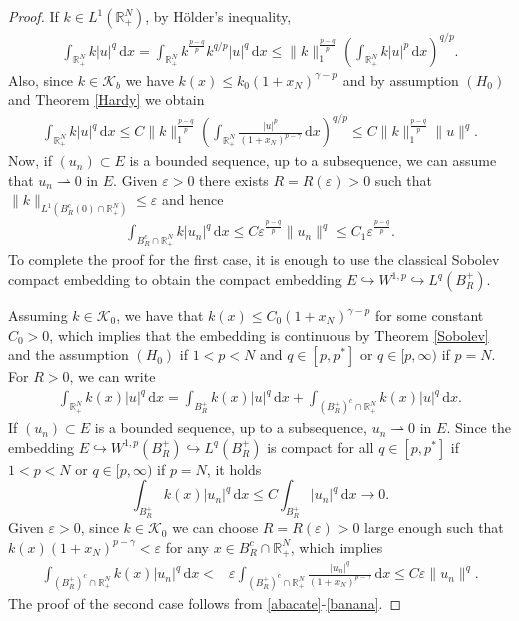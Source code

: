 \documentclass[12pt,reqno]{amsart}
\begin{document}
\begin{proof} 
If $k \in L^1(\mathds{R}^N_+)$, by H\"{o}lder's inequality,
\begin{align*}
\int_{\mathds{R}^N_+}k|u|^q\, \mathrm{d} x=\int_{\mathds{R}^N_+}k^{\frac{p-q}{p}}k^{q/p}|u|^q\, \mathrm{d} x
    \leq\|k\|_1^{\frac{p-q}{p}}\left(\int_{\mathds{R}^N_+} k|u|^p\, \mathrm{d} x\right)^{q/p}.
\end{align*}
Also, since $k\in\mathcal{K}_b$ we have $k(x)\leq k_0(1+x_N)^{\gamma-p}$ and  by assumption $(H_0)$ and  Theorem \ref{Hardy} we obtain
\begin{align*}
\int_{\mathds{R}^N_+}k|u|^q \, \mathrm{d} x\leq C\|k\|_1^{\frac{p-q}{p}}\left(\int_{\mathds{R}^N_+}\frac{|u|^p}{(1+x_N)^{p-\gamma}} \, \mathrm{d} x \right)^{q/p}
\leq C\|k\|_1^{\frac{p-q}{p}}\|u\|^q.
\end{align*}
Now, if $(u_n) \subset E$ is a bounded sequence, up to a subsequence, we can assume that $u_n \rightharpoonup 0$ in $E$. Given $\varepsilon>0$ there exists $R=R(\varepsilon)>0$ such that $\|k\|_{L^1(B^c_R(0)\cap\mathds{R}^N_+)}\leq\varepsilon$ and hence 
\begin{align*}
\int_{B_R^c\cap \mathds{R}^N_+}k|u_n|^q\, \mathrm{d} x\leq  C\varepsilon^{\frac{p-q}{p}}\|u_n\|^q\leq C_1\varepsilon^{\frac{p-q}{p}}.
\end{align*}
To complete the proof for the first case, it is enough to use the classical Sobolev compact embedding to obtain the compact embedding $E\hookrightarrow W^{1,p}\hookrightarrow L^q(B_R^+)$.

Assuming  $k\in \mathcal{K}_0$, we have that $k(x)\leq C_0(1+x_N)^{\gamma-p}$ for some constant $C_0>0$, which implies that the embedding is continuous by Theorem \ref{Sobolev} and the assumption $(H_0)$ if $1<p<N$ and $q\in [p,p^*]$ or $q\in [p,\infty)$ if $p=N$. 
For $R>0$, we can write 
\begin{align*}
		\int_{\mathds{R}^N_+}k(x)|u|^q\, \mathrm{d} x=\int_{B_R^+}k(x)|u|^q\, \mathrm{d} x+\int_{(B_R^+)^c\cap \mathds{R}^N_+}k(x)|u|^q\, \mathrm{d} x.
	\end{align*}
If $(u_n) \subset E$ is a bounded sequence, up to a subsequence,  $u_n \rightharpoonup 0$ in $E$. Since the embedding $E\hookrightarrow W^{1,p}(B_R^+)\hookrightarrow L^q(B_R^+)$ is compact for all  $q\in [p,p^*]$ if  $1<p<N$ or $q\in [p,\infty)$ if $p=N$, it holds 
	\begin{equation}\label{abacate}
		\int_{B_R^+}k(x)|u_n|^q\, \mathrm{d} x \leq C\int_{B_R^+}|u_n|^q\, \mathrm{d} x \rightarrow 0.
	\end{equation}
Given $\varepsilon>0$, since $k\in\mathcal{K}_0 $ we can choose $R=R(\varepsilon)>0$ large enough such that $k(x)(1+x_N)^{p-\gamma}<\varepsilon$ for any $x\in B_R^c\cap\mathds{R}^N_+$, which implies
	\begin{align}\label{banana}
		\int_{(B_R^+)^c\cap \mathds{R}^N_+}k(x)|u_n|^q\, \mathrm{d} x <&  \varepsilon   \int_{(B_R^+)^c\cap \mathds{R}^N_+}\frac{|u_n|^q}{(1+x_N)^{p-\gamma}}\, \mathrm{d} x\leq C\varepsilon\|u_n\|^q.
	\end{align}
The proof of the second case follows from \eqref{abacate}-\eqref{banana}.\end{proof}
\end{document}
